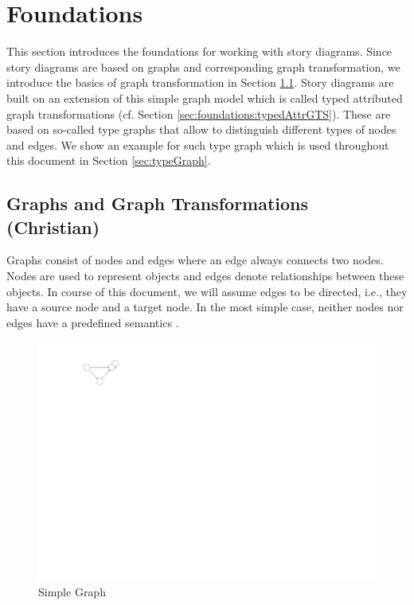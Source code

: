 \chapter{Foundations}
\label{sec:foundations}

This section introduces the foundations for working with story diagrams. Since story diagrams are based on graphs and corresponding graph transformation, we introduce the basics of graph transformation in Section \ref{sec:foundations:simpleGTS}. Story diagrams are built on an extension of this simple graph model which is called typed attributed graph transformations (cf. Section \ref{sec:foundations:typedAttrGTS}). These are based on so-called type graphs that allow to distinguish different types of nodes and edges. We show an example for such type graph which is used throughout this document in Section \ref{sec:typeGraph}.

\section{Graphs and Graph Transformations (Christian)}
\label{sec:foundations:simpleGTS}

Graphs consist of nodes and edges where an edge always connects two nodes. Nodes are used to represent objects and edges denote relationships between these objects. In course of this document, we will assume edges to be directed, i.e., they have a source node and a target node. In the most simple case, neither nodes nor edges have a predefined semantics \cite{Roz97}.

\begin{figure}[htbp]
  \centering
  \includegraphics[scale=1.5]{figures/SimpleGraph}
  \caption{Simple Graph}
  \label{fig:simpleGraph}
\end{figure}

